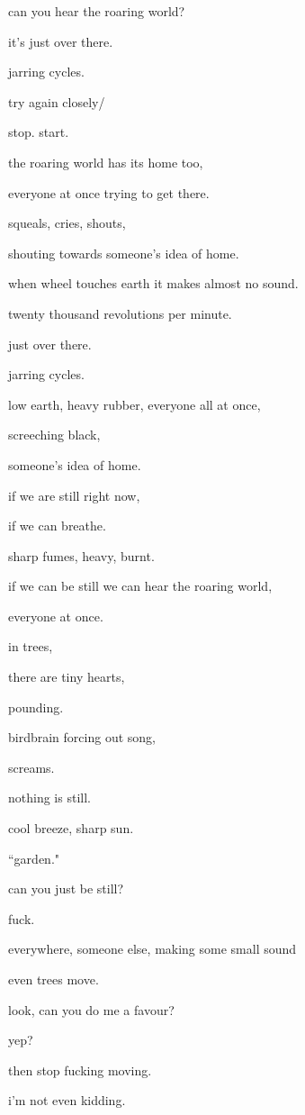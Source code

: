 \documentclass{article}
\begin{document}
	\newpage

	can you hear the roaring world?

	it's just over there.

	jarring cycles.

	try again closely/ 

	stop. start.\newpage

	the roaring world has its home too,

	everyone at once trying to get there.

	squeals, cries, shouts,

	shouting towards someone's idea of home.\newpage

	when wheel touches earth it makes almost no sound.

	twenty thousand revolutions per minute.

	just over there.

	jarring cycles.\newpage

	low earth, heavy rubber, everyone all at once,

	screeching black,

	someone's idea of home.\newpage

	if we are still right now,

	if we can breathe.

	sharp fumes, heavy, burnt.

	if we can be still we can hear the roaring world,

	everyone at once.

	\newpage
	
	in trees,

	there are tiny hearts,

	pounding.\newpage

	birdbrain forcing out song,

	screams.\newpage

	nothing is still.

	cool breeze, sharp sun.

	``garden."

	can you just be still?

	fuck.\newpage

	everywhere, someone else, making some small sound

	even trees move.

	look, can you do me a favour?

	yep?

	then stop fucking moving.\newpage

	i'm not even kidding.
\end{document}
